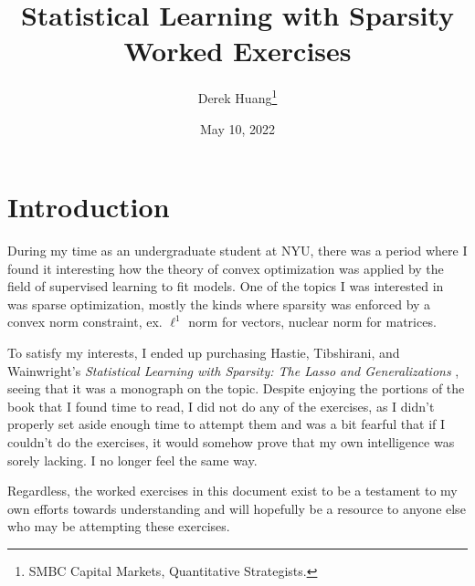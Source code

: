 \documentclass{article}
\title{Statistical Learning with Sparsity \\ \Large Worked Exercises}
\author{Derek Huang\thanks{SMBC Capital Markets, Quantitative Strategists.}}
\date{May 10, 2022}
\numberwithin{equation}{section}
\begin{document}
\newcommand{\newtocsubsection}[1]{%
    \subsection*{#1} \addcontentsline{toc}{subsection}{#1}%
}

\maketitle


\tableofcontents

\newpage

\section{Introduction}

During my time as an undergraduate student at NYU, there was a period where
I found it interesting how the theory of convex optimization was applied by
the field of supervised learning to fit models. One of the topics I was
interested in was sparse optimization, mostly the kinds where sparsity was
enforced by a convex norm constraint, ex. $ \ell^1 $ norm for vectors,
nuclear norm for matrices.

\medskip

To satisfy my interests, I ended up purchasing Hastie, Tibshirani, and
Wainwright's \textit{%
    Statistical Learning with Sparsity: The Lasso and Generalizations%
}, seeing that it was a monograph on the topic. Despite enjoying the portions
of the book that I found time to read, I did not do any of the exercises,
as I didn't properly set aside enough time to attempt them and was a bit
fearful that if I couldn't do the exercises, it would somehow prove that my
own intelligence was sorely lacking. I no longer feel the same way.

\medskip

Regardless, the worked exercises in this document exist to be a testament
to my own efforts towards understanding and will hopefully be a resource to
anyone else who may be attempting these exercises.

\medskip

\end{document}
